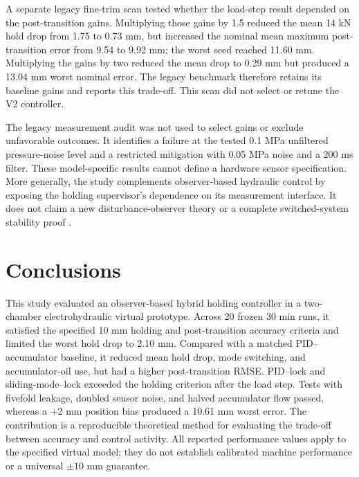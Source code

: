 \documentclass[machines,article,submit,pdftex,moreauthors]{Definitions/mdpi}
\begin{document}
A separate legacy fine-trim scan tested whether the load-step result depended on the post-transition gains. Multiplying those gains by 1.5 reduced the mean 14 kN hold drop from 1.75 to 0.73 mm, but increased the nominal mean maximum post-transition error from 9.54 to 9.92 mm; the worst seed reached 11.60 mm. Multiplying the gains by two reduced the mean drop to 0.29 mm but produced a 13.04 mm worst nominal error. The legacy benchmark therefore retains its baseline gains and reports this trade-off. This scan did not select or retune the V2 controller.

The legacy measurement audit was not used to select gains or exclude unfavorable outcomes. It identifies a failure at the tested 0.1 MPa unfiltered pressure-noise level and a restricted mitigation with 0.05 MPa noise and a 200 ms filter. These model-specific results cannot define a hardware sensor specification. More generally, the study complements observer-based hydraulic control \cite{chen2016,feng2025} by exposing the holding supervisor's dependence on its measurement interface. It does not claim a new disturbance-observer theory or a complete switched-system stability proof \cite{goebel2009,liberzon1999}.

\section{Conclusions}
This study evaluated an observer-based hybrid holding controller in a two-chamber electrohydraulic virtual prototype. Across 20 frozen 30 min runs, it satisfied the specified 10 mm holding and post-transition accuracy criteria and limited the worst hold drop to 2.10 mm. Compared with a matched PID--accumulator baseline, it reduced mean hold drop, mode switching, and accumulator-oil use, but had a higher post-transition RMSE. PID--lock and sliding-mode--lock exceeded the holding criterion after the load step. Tests with fivefold leakage, doubled sensor noise, and halved accumulator flow passed, whereas a +2 mm position bias produced a 10.61 mm worst error. The contribution is a reproducible theoretical method for evaluating the trade-off between accuracy and control activity. All reported performance values apply to the specified virtual model; they do not establish calibrated machine performance or a universal $\pm10$ mm guarantee.
\end{document}
